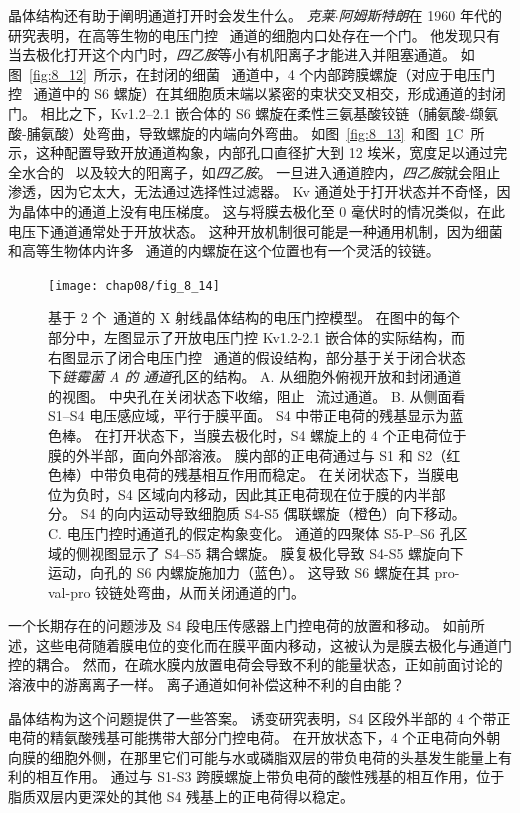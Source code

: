 晶体结构还有助于阐明通道打开时会发生什么。
\textit{克莱$\cdot$阿姆斯特朗}在 1960 年代的研究表明，在高等生物的电压门控~ 通道的细胞内口处存在一个门。
他发现只有当去极化打开这个内门时，\textit{四乙胺}等小有机阳离子才能进入并阻塞通道。
如图~\ref{fig:8_12}~所示，在封闭的细菌~ 通道中，4 个内部跨膜螺旋（对应于电压门控~ 通道中的 S6 螺旋）在其细胞质末端以紧密的束状交叉相交，形成通道的封闭门。
相比之下，Kv1.2–2.1 嵌合体的 S6 螺旋在柔性三氨基酸铰链（脯氨酸-缬氨酸-脯氨酸）处弯曲，导致螺旋的内端向外弯曲。
如图~\ref{fig:8_13}~和图~\ref{fig:8_14}C~所示，这种配置导致开放通道构象，内部孔口直径扩大到 12 埃米，宽度足以通过完全水合的~ 以及较大的阳离子，如\textit{四乙胺}。
一旦进入通道腔内，\textit{四乙胺}就会阻止~ 渗透，因为它太大，无法通过选择性过滤器。
Kv 通道处于打开状态并不奇怪，因为晶体中的通道上没有电压梯度。
这与将膜去极化至 0 毫伏时的情况类似，在此电压下通道通常处于开放状态。
这种开放机制很可能是一种通用机制，因为细菌和高等生物体内许多~ 通道的内螺旋在这个位置也有一个灵活的铰链。


\begin{figure}[htbp]
	\centering
	\texttt{[image: chap08/fig\_8\_14]}
	\caption{基于 2 个~通道的 X 射线晶体结构的电压门控模型。
		在图中的每个部分中，左图显示了开放电压门控 Kv1.2-2.1 嵌合体的实际结构，而右图显示了闭合电压门控~ 通道的假设结构，部分基于关于闭合状态下\textit{链霉菌 A 的  通道}孔区的结构。
		A. 从细胞外俯视开放和封闭通道的视图。
		中央孔在关闭状态下收缩，阻止~ 流过通道。
		B. 从侧面看 S1–S4 电压感应域，平行于膜平面。
		S4 中带正电荷的残基显示为蓝色棒。
		在打开状态下，当膜去极化时，S4 螺旋上的 4 个正电荷位于膜的外半部，面向外部溶液。
		膜内部的正电荷通过与 S1 和 S2（红色棒）中带负电荷的残基相互作用而稳定。
		在关闭状态下，当膜电位为负时，S4 区域向内移动，因此其正电荷现在位于膜的内半部分。
		S4 的向内运动导致细胞质 S4-S5 偶联螺旋（橙色）向下移动。
		C. 电压门控时通道孔的假定构象变化。
		通道的四聚体 S5-P–S6 孔区域的侧视图显示了 S4–S5 耦合螺旋。
		膜复极化导致 S4-S5 螺旋向下运动，向孔的 S6 内螺旋施加力（蓝色）。
		这导致 S6 螺旋在其 pro-val-pro 铰链处弯曲，从而关闭通道的门。}
	\label{fig:8_14}
\end{figure}


一个长期存在的问题涉及 S4 段电压传感器上门控电荷的放置和移动。
如前所述，这些电荷随着膜电位的变化而在膜平面内移动，这被认为是膜去极化与通道门控的耦合。
然而，在疏水膜内放置电荷会导致不利的能量状态，正如前面讨论的溶液中的游离离子一样。
离子通道如何补偿这种不利的自由能？


晶体结构为这个问题提供了一些答案。
诱变研究表明，S4 区段外半部的 4 个带正电荷的精氨酸残基可能携带大部分门控电荷。
在开放状态下，4 个正电荷向外朝向膜的细胞外侧，在那里它们可能与水或磷脂双层的带负电荷的头基发生能量上有利的相互作用。
通过与 S1-S3 跨膜螺旋上带负电荷的酸性残基的相互作用，位于脂质双层内更深处的其他 S4 残基上的正电荷得以稳定。


